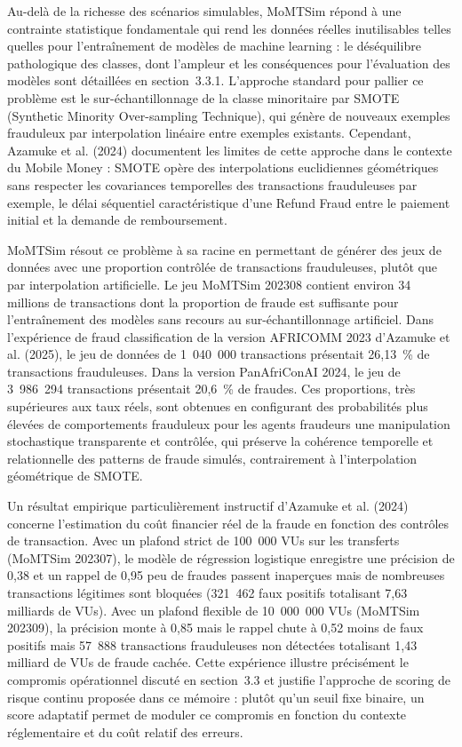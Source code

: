\documentclass[11pt,a4paper,oneside]{report}
\theoremstyle{definition}
\theoremstyle{remark}
\begin{document}
Au-delà de la richesse des scénarios simulables, MoMTSim répond à une contrainte statistique fondamentale qui rend les données réelles inutilisables telles quelles pour l'entraînement de modèles de machine learning : le déséquilibre pathologique des classes, dont l'ampleur et les conséquences pour l'évaluation des modèles sont détaillées en section~3.3.1. L'approche standard pour pallier ce problème est le sur-échantillonnage de la classe minoritaire par SMOTE (Synthetic Minority Over-sampling Technique), qui génère de nouveaux exemples frauduleux par interpolation linéaire entre exemples existants. Cependant, Azamuke et al. (2024) documentent les limites de cette approche dans le contexte du Mobile Money : SMOTE opère des interpolations euclidiennes géométriques sans respecter les covariances temporelles des transactions frauduleuses  par exemple, le délai séquentiel caractéristique d'une Refund Fraud entre le paiement initial et la demande de remboursement.

MoMTSim résout ce problème à sa racine en permettant de générer des jeux de données avec une proportion contrôlée de transactions frauduleuses, plutôt que par interpolation artificielle. Le jeu MoMTSim 202308 contient environ 34 millions de transactions dont la proportion de fraude est suffisante pour l'entraînement des modèles sans recours au sur-échantillonnage artificiel. Dans l'expérience de fraud classification de la version AFRICOMM 2023 d'Azamuke et al. (2025), le jeu de données de 1~040~000 transactions présentait 26,13~\% de transactions frauduleuses. Dans la version PanAfriConAI 2024, le jeu de 3~986~294 transactions présentait 20,6~\% de fraudes. Ces proportions, très supérieures aux taux réels, sont obtenues en configurant des probabilités plus élevées de comportements frauduleux pour les agents fraudeurs  une manipulation stochastique transparente et contrôlée, qui préserve la cohérence temporelle et relationnelle des patterns de fraude simulés, contrairement à l'interpolation géométrique de SMOTE.

Un résultat empirique particulièrement instructif d'Azamuke et al. (2024) concerne l'estimation du coût financier réel de la fraude en fonction des contrôles de transaction. Avec un plafond strict de 100~000 VUs sur les transferts (MoMTSim 202307), le modèle de régression logistique enregistre une précision de 0,38 et un rappel de 0,95  peu de fraudes passent inaperçues mais de nombreuses transactions légitimes sont bloquées (321~462 faux positifs totalisant 7,63 milliards de VUs). Avec un plafond flexible de 10~000~000 VUs (MoMTSim 202309), la précision monte à 0,85 mais le rappel chute à 0,52  moins de faux positifs mais 57~888 transactions frauduleuses non détectées totalisant 1,43 milliard de VUs de fraude cachée. Cette expérience illustre précisément le compromis opérationnel discuté en section~3.3 et justifie l'approche de scoring de risque continu proposée dans ce mémoire : plutôt qu'un seuil fixe binaire, un score adaptatif permet de moduler ce compromis en fonction du contexte réglementaire et du coût relatif des erreurs.
\end{document}
